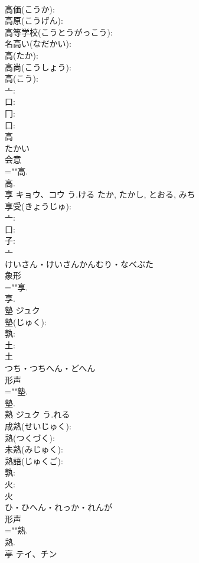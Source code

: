 \documentclass[8pt]{extreport}
\begin{document}
\begin{CJK}{UTF8}{min}
\\	高価(こうか): 
\\	高原(こうげん): 
\\	高等学校(こうとうがっこう): 
\\	名高い(なだかい): 
\\	高(たか): 
\\	高尚(こうしょう): 
\\	高(こう): 
\\	亠: 
\\	口: 
\\	冂: 
\\	口: 
\\	高	
\\	たかい	
\\	会意 
\\	=""高.
\\	高.
\\	享	キョウ、コウ	う.ける	たか, たかし, とおる, みち	
\\	享受(きょうじゅ): 
\\	亠: 
\\	口: 
\\	子: 
\\	亠	
\\	けいさん・けいさんかんむり・なべぶた	
\\	象形 
\\	=""享.
\\	享.
\\	塾	ジュク			
\\	塾(じゅく): 
\\	孰: 
\\	土: 
\\	土	
\\	つち・つちへん・どへん	
\\	形声 
\\	=""塾.
\\	塾.
\\	熟	ジュク	う.れる		
\\	成熟(せいじゅく): 
\\	熟(つくづく): 
\\	未熟(みじゅく): 
\\	熟語(じゅくご): 
\\	孰: 
\\	火: 
\\	火	
\\	ひ・ひへん・れっか・れんが	
\\	形声 
\\	=""熟.
\\	熟.
\\	亭	テイ、チン			

\end{CJK}
\end{document}
